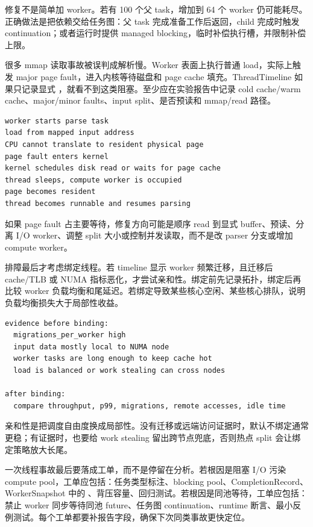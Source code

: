 修复不是简单加 worker。若有 100 个父 task，增加到 64 个 worker 仍可能耗尽。正确做法是把依赖交给任务图：父 task 完成准备工作后返回，child 完成时触发 continuation；或者运行时提供 managed blocking，临时补偿执行槽，并限制补偿上限。

很多 mmap 读取事故被误判成解析慢。Worker 表面上执行普通 load，实际上触发 major page fault，进入内核等待磁盘和 page cache 填充。ThreadTimeline 如果只记录显式 ，就看不到这类阻塞。至少应在实验报告中记录 cold cache/warm cache、major/minor faults、input split、是否预读和 mmap/read 路径。

\begin{lstlisting}[numbers=none,caption={mmap 冷页路径的事件链}]
worker starts parse task
load from mapped input address
CPU cannot translate to resident physical page
page fault enters kernel
kernel schedules disk read or waits for page cache
thread sleeps, compute worker is occupied
page becomes resident
thread becomes runnable and resumes parsing
\end{lstlisting}

如果 page fault 占主要等待，修复方向可能是顺序 read 到显式 buffer、预读、分离 I/O worker、调整 split 大小或控制并发读取，而不是改 parser 分支或增加 compute worker。

排障最后才考虑绑定线程。若 timeline 显示 worker 频繁迁移，且迁移后 cache/TLB 或 NUMA 指标恶化，才尝试亲和性。绑定前先记录拓扑，绑定后再比较 worker 负载均衡和尾延迟。若绑定导致某些核心空闲、某些核心排队，说明负载均衡损失大于局部性收益。

\begin{lstlisting}[numbers=none,caption={亲和性决策账本}]
evidence before binding:
  migrations_per_worker high
  input data mostly local to NUMA node
  worker tasks are long enough to keep cache hot
  load is balanced or work stealing can cross nodes

after binding:
  compare throughput, p99, migrations, remote accesses, idle time
\end{lstlisting}

亲和性是把调度自由度换成局部性。没有迁移或远端访问证据时，默认不绑定通常更稳；有证据时，也要给 work stealing 留出跨节点兜底，否则热点 split 会让绑定策略放大长尾。

一次线程事故最后要落成工单，而不是停留在分析。若根因是阻塞 I/O 污染 compute pool，工单应包括：任务类型标注、blocking pool、CompletionRecord、WorkerSnapshot 中的 、背压容量、回归测试。若根因是同池等待，工单应包括：禁止 worker 同步等待同池 future、任务图 continuation、runtime 断言、最小反例测试。每个工单都要补报告字段，确保下次同类事故更快定位。

